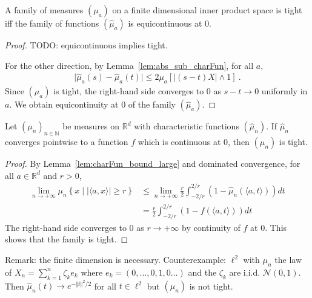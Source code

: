 \begin{lemma}\label{lem:tight_iff_charFun_equicontinuous}
\leanok
{}
A family of measures $(\mu_a)$ on a finite dimensional inner product space is tight iff the family of functions $(\hat{\mu}_a)$ is equicontinuous at 0.
\end{lemma}

\begin{proof}
TODO: equicontinuous implies tight.

For the other direction, by Lemma~\ref{lem:abs_sub_charFun}, for all $a$,
\begin{align*}
    \vert \hat{\mu}_a(s) - \hat{\mu}_a(t) \vert
    \le 2 \mu_a\left[ \left\vert (s - t) X\right\vert \wedge 1\right]
    \: .
\end{align*}
Since $(\mu_a)$ is tight, the right-hand side converges to 0 as $s - t \to 0$ uniformly in $a$.
We obtain equicontinuity at 0 of the family $(\hat{\mu}_a)$.
\end{proof}


\begin{lemma}\label{lem:tight_of_tendsto_charFun}
\leanok
{}
Let $(\mu_n)_{n \in \mathbb{N}}$ be measures on $\mathbb{R}^d$ with characteristic functions $(\hat{\mu}_n)$. If $\hat{\mu}_n$ converges pointwise to a function $f$ which is continuous at 0, then $(\mu_n)$ is tight.
\end{lemma}

\begin{proof}
By Lemma~\ref{lem:charFun_bound_large} and dominated convergence, for all $a \in \mathbb{R}^d$ and $r > 0$,
\begin{align*}
    \lim_{n \to +\infty} \mu_n \left\{x \mid |\langle a, x\rangle| \ge r\right\}
    &\le \lim_{n \to +\infty} \frac{r}{2} \int_{-2/r}^{2/r} (1 - \hat{\mu}_n(\langle a, t\rangle))dt
    \\
    &= \frac{r}{2} \int_{-2/r}^{2/r} (1 - f(\langle a, t\rangle))dt
\end{align*}
The right-hand side converges to 0 as $r \to +\infty$ by continuity of $f$ at 0.
This shows that the family is tight.
\end{proof}

Remark: the finite dimension is necessary.
Counterexample: $\ell^2$ with $\mu_n$ the law of $X_n = \sum_{k=1}^n \zeta_k e_k$ where $e_k = (0, \ldots, 0, 1, 0 \ldots)$ and the $\zeta_k$ are i.i.d. $\mathcal N(0,1)$.
Then $\hat{\mu}_n(t) \to e^{- \Vert t \Vert^2 / 2}$ for all $t \in \ell^2$ but $(\mu_n)$ is not tight.


